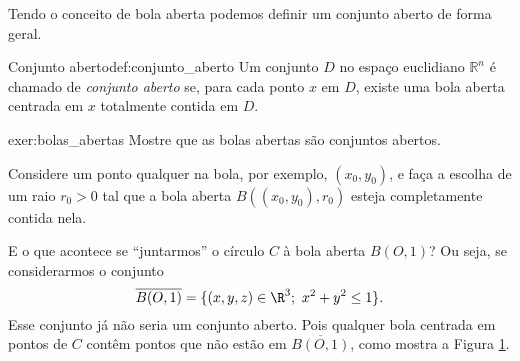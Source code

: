 Tendo o conceito de bola aberta podemos definir um conjunto aberto de forma geral. 

\begin{definition}{Conjunto aberto}{def:conjunto_aberto}
Um conjunto \(D\) no espaço euclidiano \(\mathbb{R}^n\) é chamado de \textit{conjunto aberto} se, %
para cada ponto \(x\) em \(D\), existe uma bola aberta centrada em \(x\) totalmente contida em \(D\).
\end{definition}

\begin{exercise}{}{exer:bolas_abertas}
Mostre que as bolas abertas são conjuntos abertos. 

\dica 
Considere um ponto qualquer na bola, por exemplo, \((x_0, y_0)\), e faça a escolha de um raio \(r_0 > 0\) tal que a bola aberta \(B((x_0, y_0), r_0)\) esteja completamente contida nela. 
\end{exercise}



E o que acontece se ``juntarmos'' o círculo $C$ à bola aberta $B(O,1)$? Ou seja, se considerarmos o conjunto 
\[\overline{B(O, 1)} = \{(x,y,z)\in\R^3 ;~x^2+y^2 \leq 1\}.\]
Esse conjunto já não seria um conjunto aberto. Pois qualquer bola centrada em pontos de $C$ contêm pontos que não estão em $\overline{B(O,1)}$, como mostra a Figura \ref{fig:disco_fechado}. 
\begin{figure}[!htb]
\centering
{}
\caption{}
  \label{fig:disco_fechado}
\end{figure}


